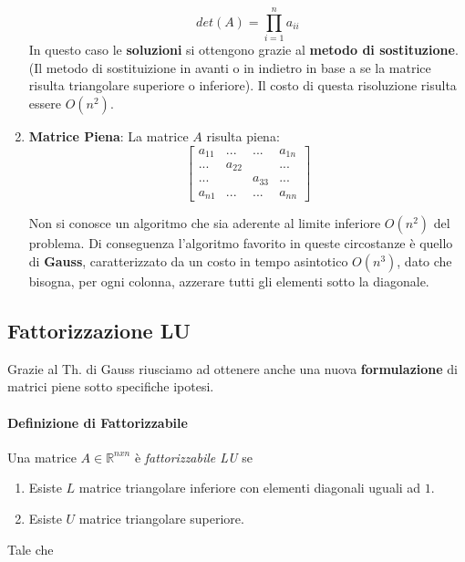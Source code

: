 \documentclass{article}
\begin{document}
\begin{enumerate}
    \[ det(A) = \prod_{i=1}^{n} a_{ii} \]
    \vspace*{5px}
    In questo caso le \textbf{soluzioni} si ottengono grazie al \textbf{metodo di sostituzione}. (Il metodo di sostituizione in avanti o in indietro in base a se la matrice risulta triangolare superiore o inferiore). Il costo di questa risoluzione risulta essere $O(n^{2})$.
    \item \textbf{Matrice Piena}: La matrice $A$ risulta piena:
    \[
    \begin{bmatrix}
    a_{11} & ... & ...  & a_{1n}\\
    ... & a_{22} &  & ...\\
     ...&  & a_{33} &  ...\\
     a_{n1} & ... & ... & a_{nn}
    \end{bmatrix}
    \]

    Non si conosce un algoritmo che sia aderente al limite inferiore $O(n^{2})$ del problema. Di conseguenza l'algoritmo favorito in queste circostanze è quello di \textbf{Gauss}, caratterizzato da un costo in tempo asintotico $O(n^{3})$, dato che bisogna, per ogni colonna, azzerare tutti gli elementi sotto la diagonale.
    
\end{enumerate}

\newpage

\subsection{Fattorizzazione LU}

Grazie al Th. di Gauss riusciamo ad ottenere anche una nuova \textbf{formulazione} di matrici piene sotto specifiche ipotesi.

\paragraph{Definizione di Fattorizzabile} Una matrice $A \in \mathbb{R}^{nxn}$ è \textit{fattorizzabile LU} se

\begin{enumerate}
    \item Esiste $L$ matrice triangolare inferiore con elementi diagonali uguali ad $1$.
    \item Esiste $U$ matrice triangolare superiore.
\end{enumerate}

Tale che

\vspace*{-8px}
\end{document}
